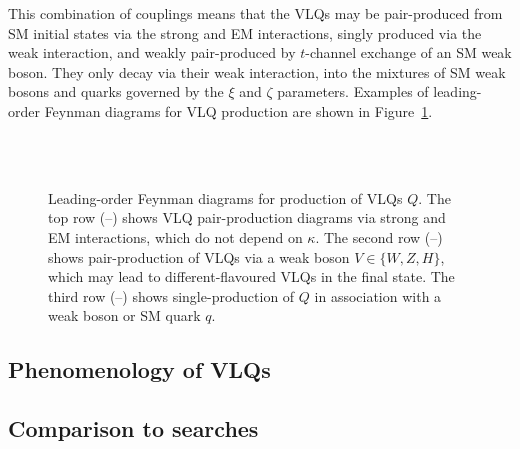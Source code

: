This combination of couplings means that the VLQs may be pair-produced from SM
initial states via the strong and EM interactions,
singly produced via the weak interaction, and weakly pair-produced by
$t$-channel exchange of an SM weak boson. They only decay via their weak
interaction, into the mixtures of SM weak bosons and quarks governed by the
$\xi$ and $\zeta$ parameters. Examples of leading-order Feynman diagrams for VLQ production are shown in
Figure~\ref{fig:feyndiags}.

\begin{figure}[t]
  \centering
  \\
  \\
  \caption{Leading-order Feynman diagrams for production of VLQs $Q$.  The top row
  (\protect{}--\protect{}) shows VLQ
  pair-production diagrams via strong and EM interactions, which do not depend
  on $\kappa$.  The second row
  (\protect{}--\protect{}) shows
  pair-production of VLQs via a weak boson $V \in \{W,Z,H\}$, which may lead to
  different-flavoured VLQs in the final state.  The third row
  (\protect{}--\protect{}) shows
  single-production of $Q$ in association with a weak boson or
  SM quark $q$.}
\label{fig:feyndiags}
\end{figure}

\subsection{Phenomenology of VLQs}


\subsection{Comparison to \ATLAS searches}


\subsection{}